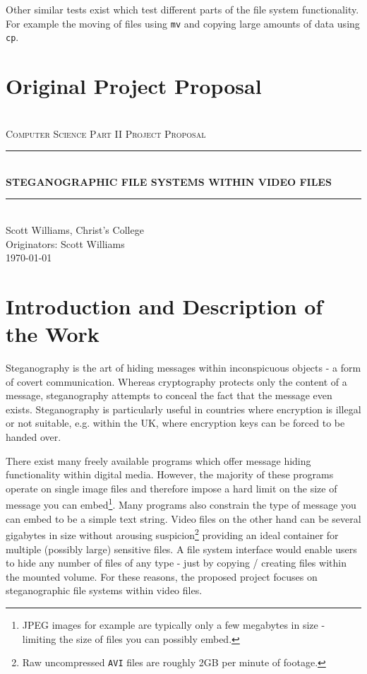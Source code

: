 \documentclass[paper=a4, fontsize=11pt,twoside]{scrartcl}
\makeatletter
\numberwithin{table}{section}
\numberwithin{figure}{section}
\numberwithin{algorithm}{section}
\newcommand{\HRule}[1]{\rule{\linewidth}{#1}}
\def\printauthor{%
    {\large \@author}}
\makeatother
\begin{document}
Other similar tests exist which test different parts of the file system functionality. For example the moving of files using \texttt{mv} and copying large amounts of data using \texttt{cp}.

\vfill
\pagebreak

\section{Original Project Proposal} 

\begin{center}	
 	~\\[2.0cm]			
	\normalsize \textsc{Computer Science Part II Project Proposal}\\[2.0cm]     
    \HRule{0.5pt} \\                        
    \LARGE \textbf{\uppercase{Steganographic file systems within video files}}    
    \HRule{2pt} \\[30pt]        
    \normalsize Scott Williams, Christ's College\\[2pt]Originators: Scott Williams\\[25pt]           
    \normalsize \today            
     \vfill
\end{center}
\printauthor                
\newpage
\section*{Introduction and Description of the Work}

Steganography is the art of hiding messages within inconspicuous objects - a form of covert communication. Whereas cryptography protects only the content of a message, steganography attempts to conceal the fact that the message even exists. Steganography is particularly useful in countries where encryption is illegal or not suitable, e.g. within the UK, where encryption keys can be forced to be handed over.

There exist many freely available programs which offer message hiding functionality within digital media. However, the majority of these programs operate on single image files and therefore impose a hard limit on the size of message you can embed\footnote{JPEG images for example are typically only a few megabytes in size - limiting the size of files you can possibly embed.}. Many programs also constrain the type of message you can embed to be a simple text string. Video files on the other hand can be several gigabytes in size without arousing suspicion\footnote{Raw uncompressed \texttt{AVI} files are roughly 2GB per minute of footage.} providing an ideal container for multiple (possibly large) sensitive files. A file system interface would enable users to hide any number of files of any type - just by copying / creating files within the mounted volume. For these reasons, the proposed project focuses on steganographic file systems within video files.
\end{document}
